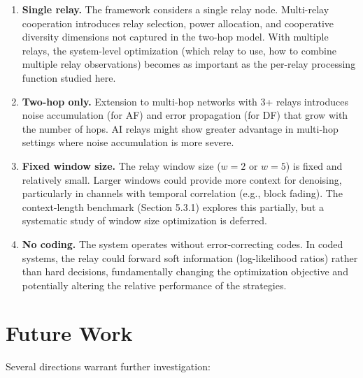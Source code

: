 \begin{enumerate}
\item
  \textbf{Single relay.} The framework considers a single relay node. Multi-relay cooperation introduces relay selection, power allocation, and cooperative diversity dimensions not captured in the two-hop model. With multiple relays, the system-level optimization (which relay to use, how to combine multiple relay observations) becomes as important as the per-relay processing function studied here.
\item
  \textbf{Two-hop only.} Extension to multi-hop networks with 3+ relays introduces noise accumulation (for AF) and error propagation (for DF) that grow with the number of hops. AI relays might show greater advantage in multi-hop settings where noise accumulation is more severe.
\item
  \textbf{Fixed window size.} The relay window size (\(w = 2\) or \(w = 5\)) is fixed and relatively small. Larger windows could provide more context for denoising, particularly in channels with temporal correlation (e.g., block fading). The context-length benchmark (Section 5.3.1) explores this partially, but a systematic study of window size optimization is deferred.
\item
  \textbf{No coding.} The system operates without error-correcting codes. In coded systems, the relay could forward soft information (log-likelihood ratios) rather than hard decisions, fundamentally changing the optimization objective and potentially altering the relative performance of the strategies.
\end{enumerate}

\section{Future Work}\label{sec:future-work}

Several directions warrant further investigation:

